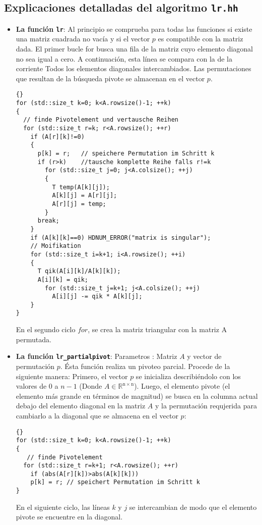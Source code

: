 \documentclass[a4paper,11pt]{article}
\theoremstyle{definition}
\begin{document}
\subsection{Explicaciones detalladas del algoritmo \lstinline{lr.hh}}
\begin{itemize}
\item \textbf{La función \lstinline{lr}}: Al principio se comprueba para todas 
las funciones si existe una matriz cuadrada no vacía y si el vector $p$ 
es compatible con la matriz dada. El primer bucle for busca una fila de
la matriz cuyo elemento diagonal no sea igual a cero. A continuación, 
esta línea se compara con la de la corriente Todos los elementos diagonales
intercambiados. Las permutaciones que resultan de la búsqueda pivote 
se almacenan en el vector $p$.

{\footnotesize{\begin{lstlisting}{}
for (std::size_t k=0; k<A.rowsize()-1; ++k)
{
  // finde Pivotelement und vertausche Reihen
  for (std::size_t r=k; r<A.rowsize(); ++r)
    if (A[r][k]!=0)
    {
      p[k] = r;   // speichere Permutation im Schritt k
      if (r>k)    //tausche komplette Reihe falls r!=k
        for (std::size_t j=0; j<A.colsize(); ++j)
        {
          T temp(A[k][j]);
          A[k][j] = A[r][j];
          A[r][j] = temp;
        }
      break;
    }
    if (A[k][k]==0) HDNUM_ERROR("matrix is singular");
    // Moifikation
    for (std::size_t i=k+1; i<A.rowsize(); ++i)
    {
      T qik(A[i][k]/A[k][k]);
      A[i][k] = qik;
        for (std::size_t j=k+1; j<A.colsize(); ++j)
          A[i][j] -= qik * A[k][j];
    }
}
\end{lstlisting}}}

  En el segundo ciclo $for$, se crea la matriz triangular con la matriz A
  permutada.

\item \textbf{La función \lstinline{lr_partialpivot}}: Parametros :
  Matriz $A$ y vector de permutación $p$.  Ésta función realiza un pivoteo parcial.
  Procede de la siguiente manera: Primero, el vector $p$ se inicializa describiéndolo
  con los valores de $0$ a $n-1$ (Donde $A \in \mathbb{R^{\mathrm{n}\times \mathrm{n}}}$).  
  Luego, el elemento pivote (el elemento más grande en términos de magnitud) se busca en la columna actual
  debajo del elemento diagonal en la matriz $A$ y la permutación requjerida para cambiarlo
  a la diagonal que se almacena en el vector $p$:

{\footnotesize{\begin{lstlisting}{}
for (std::size_t k=0; k<A.rowsize()-1; ++k)
{
   // finde Pivotelement
  for (std::size_t r=k+1; r<A.rowsize(); ++r)
    if (abs(A[r][k])>abs(A[k][k]))
    p[k] = r; // speichert Permutation im Schritt k
}
\end{lstlisting}}}
  En el siguiente ciclo, las líneas $k$ y $j$ se intercambian de modo que 
  el elemento pivote se encuentre en la diagonal.


\end{itemize}
\end{document}
